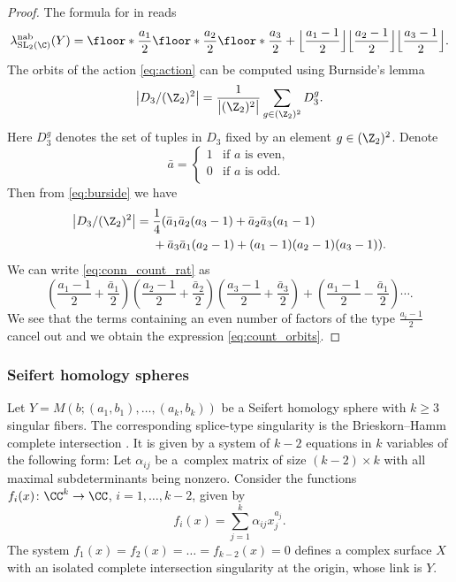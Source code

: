 \documentclass[pdftex]{sigma}
\begin{document}
\begin{proof}
 The formula for  in \cite[p.~20]{CuQiWa21} reads
 \begin{equation}\label{eq:conn_count_rat}
\lambda^{\rm nab}_{\operatorname{SL}_2(\C)}(Y) = \floor*{\frac{a_1}{2}}\floor*{\frac{a_2}{2}}\floor*{\frac{a_3}{2}}+\Big\lfloor\frac{a_1-1}{2}\Big\rfloor\Big\lfloor\frac{a_2-1}{2}\Big\rfloor
 \Big\lfloor\frac{a_3-1}{2}\Big\rfloor.
 \end{equation}
 The orbits of the action \eqref{eq:action} can be computed using Burnside's lemma
 \begin{equation}\label{eq:burside}
 \big\lvert D_3/(\Z_2)^2\big\rvert = \frac{1}{\big\lvert(\Z_2)^2\big\rvert} \sum_{g \in (\Z_2)^2} D_3^g.
 \end{equation}
 Here $D_3^g$ denotes the set of tuples in $D_3$ fixed by an element $g \in (\Z_2)^2$.
Denote
 \[
 \bar{a} =
 \begin{cases}
 1 & \text{if } a \text{ is even},\\
 0 & \text{if } a \text{ is odd}.\\
 \end{cases}
 \]
Then from \eqref{eq:burside} we have
\begin{align}
\big\lvert D_3/(\Z_2)^2\big\rvert
={}& \frac14 (\bar{a}_1\bar{a}_2(a_3-1)+\bar{a}_2\bar{a}_3(a_1-1)\nonumber\\
&+\bar{a}_3\bar{a}_1(a_2-1)+(a_1-1)(a_2-1)(a_3-1)).\label{eq:count_orbits}
\end{align}
We can write \eqref{eq:conn_count_rat} as
\[
 \left(\frac{a_1-1}{2}+\frac{\bar{a}_1}{2}\right)\left(\frac{a_2-1}{2}+\frac{\bar{a}_2}{2}\right)\left(\frac{a_3-1}{2}+\frac{\bar{a}_3}{2}\right)+\left(\frac{a_1-1}{2}-\frac{\bar{a}_1}{2}\right)\cdots.
\]
We see that the terms containing an even number of factors of the type $\frac{a_i-1}{2}$ cancel out and we obtain the expression \eqref{eq:count_orbits}.
\end{proof}

\subsubsection{Seifert homology spheres}

Let $Y = M(b;(a_1, b_1), \dots, (a_k, b_k))$ be a Seifert homology sphere with $k \geq 3$ singular fibers. The corresponding splice-type singularity is the Brieskorn--Hamm complete intersection \cite{Neu83}. It is given by a system of $k-2$ equations in $k$ variables of the following form: Let $\alpha_{ij}$ be a~complex matrix of size $(k-2) \times k$ with all maximal subdeterminants being nonzero. Consider the functions~$f_i(x)\colon \CC^k \rightarrow \CC$, $i = 1, \dots, k-2$, given by
\begin{equation}\label{icis}
	f_i(x) = \sum_{j=1}^k \alpha_{ij} x_j^{a_j}.
\end{equation}
The system
$
	f_1(x) = f_2(x) = \dots = f_{k-2}(x) = 0
$
defines a complex surface $X$ with an isolated complete intersection singularity at the origin, whose link is $Y$.
\end{document}
